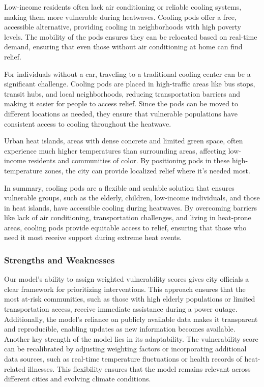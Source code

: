 \documentclass[12pt]{article}
\begin{document}
Low-income residents often lack air conditioning or reliable cooling systems, making them more vulnerable during heatwaves. Cooling pods offer a free, accessible alternative, providing cooling in neighborhoods with high poverty levels. The mobility of the pods ensures they can be relocated based on real-time demand, ensuring that even those without air conditioning at home can find relief.

For individuals without a car, traveling to a traditional cooling center can be a significant challenge. Cooling pods are placed in high-traffic areas like bus stops, transit hubs, and local neighborhoods, reducing transportation barriers and making it easier for people to access relief. Since the pods can be moved to different locations as needed, they ensure that vulnerable populations have consistent access to cooling throughout the heatwave.

Urban heat islands, areas with dense concrete and limited green space, often experience much higher temperatures than surrounding areas, affecting low-income residents and communities of color. By positioning pods in these high-temperature zones, the city can provide localized relief where it’s needed most.

In summary, cooling pods are a flexible and scalable solution that ensures vulnerable groups, such as the elderly, children, low-income individuals, and those in heat islands, have accessible cooling during heatwaves. By overcoming barriers like lack of air conditioning, transportation challenges, and living in heat-prone areas, cooling pods provide equitable access to relief, ensuring that those who need it most receive support during extreme heat events.\cite{https://vitalsigns.edf.org/story/americas-climate-crisis-and-housing-crisis-are-converging-hurt-most-vulnerable}

\subsubsection{Strengths and Weaknesses}

\par Our model’s ability to assign weighted vulnerability scores gives city officials a clear framework for prioritizing interventions. This approach ensures that the most at-risk communities, such as those with high elderly populations or limited transportation access, receive immediate assistance during a power outage. Additionally, the model’s reliance on publicly available data makes it transparent and reproducible, enabling updates as new information becomes available. Another key strength of the model lies in its adaptability. The vulnerability score can be recalibrated by adjusting weighting factors or incorporating additional data sources, such as real-time temperature fluctuations or health records of heat-related illnesses. This flexibility ensures that the model remains relevant across different cities and evolving climate conditions.
\end{document}

